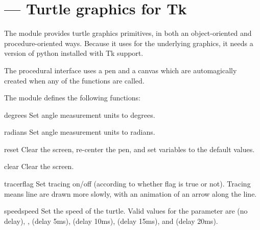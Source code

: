 \section{ ---
         Turtle graphics for Tk}




The  module provides turtle graphics primitives, in both an
object-oriented and procedure-oriented ways. Because it uses 
for the underlying graphics, it needs a version of python installed with
Tk support.

The procedural interface uses a pen and a canvas which are automagically
created when any of the functions are called.

The  module defines the following functions:

\begin{funcdesc}{degrees}{}
Set angle measurement units to degrees.
\end{funcdesc}

\begin{funcdesc}{radians}{}
Set angle measurement units to radians.
\end{funcdesc}

\begin{funcdesc}{reset}{}
Clear the screen, re-center the pen, and set variables to the default
values.
\end{funcdesc}

\begin{funcdesc}{clear}{}
Clear the screen.
\end{funcdesc}

\begin{funcdesc}{tracer}{flag}
Set tracing on/off (according to whether flag is true or not). Tracing
means line are drawn more slowly, with an animation of an arrow along the 
line.
\end{funcdesc}

\begin{funcdesc}{speed}{speed}
Set the speed of the turtle. Valid values for the parameter
 are  (no delay), ,
(delay 5ms),  (delay 10ms), 
(delay 15ms), and  (delay 20ms).
\end{funcdesc}

